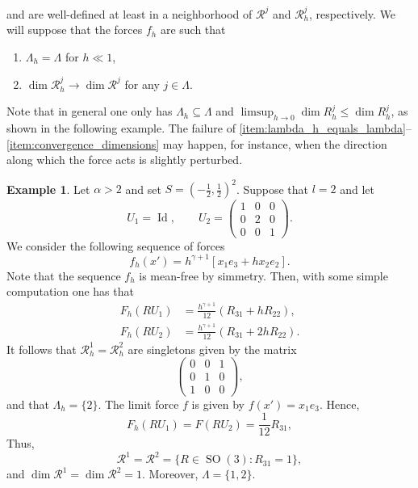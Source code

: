 \documentclass{article}
\theoremstyle{plain}
\theoremstyle{plain}
\theoremstyle{plain}
\theoremstyle{plain}
\theoremstyle{plain}
\theoremstyle{definition}
\theoremstyle{definition}
\newtheorem{example}[teo]{Example}
\DeclareMathOperator{\Id}{Id}
\DeclareMathOperator{\SO}{SO}
\begin{document}
and are well-defined at least in a neighborhood of $\mathcal{R}^j$ and $\mathcal{R}_h^j$, respectively. We will suppose that the forces $f_h$ are such that 
\begin{enumerate}[start=1,label={(F\arabic*)}]
	\item $\Lambda_h = \Lambda$ for $h \ll 1$, \label{item:lambda_h_equals_lambda}
	\item $\dim \mathcal{R}_h^j \to \dim \mathcal{R}^j$ for any $j \in \Lambda$. \label{item:convergence_dimensions}
\end{enumerate}
Note that in general one only has $ \Lambda_{h} \subseteq \Lambda $ and $ \limsup_{h \to 0} \dim R_{h}^{j} \leq \dim R_{h}^{j} $, as shown in the following example.
The failure of \ref{item:lambda_h_equals_lambda}--\ref{item:convergence_dimensions} may happen, for instance, when the direction along which the force acts is slightly perturbed.

\begin{example}
    Let $ \alpha > 2 $ and set $ S = (-\frac{1}{2},\frac{1}{2})^{2} $.
    Suppose that $ l =2 $ and let
    \begin{equation}
        U_{1} = \Id, \qquad U_{2} = \begin{pmatrix}
            1 & 0 & 0\\
            0 & 2 & 0\\
            0 & 0 & 1
        \end{pmatrix}.
    \end{equation}
    We consider the following sequence of forces
    \begin{equation}
        f_{h}(x') = h^{\gamma + 1} [x_{1}e_{3} + hx_{2}e_{2}] .
    \end{equation}
    Note that the sequence $ f_{h} $ is mean-free by simmetry.
    Then, with some simple computation one has that
    \begin{align}
        F_{h}(RU_{1}) & = \frac{h^{\gamma + 1}}{12}(R_{31} + h R_{22}), \\
        F_{h}(RU_{2}) & = \frac{h^{\gamma + 1}}{12}(R_{31} + 2h R_{22}) . 
    \end{align}
    It follows that $ \mathcal{R}_{h}^{1} = \mathcal{R}_{h}^{2}$ are singletons given by the matrix
    \begin{equation}
        \begin{pmatrix}
            0 & 0 & 1\\
            0 & 1 & 0\\
            1 & 0 & 0
        \end{pmatrix},
    \end{equation}
    and that  $ \Lambda_{h} = \{2\} $.
    The limit force $ f $ is given by $ f(x') = x_{1} e_{3} $.
    Hence, 
    \begin{equation}
        F_{h}(RU_{1}) = F(RU_{2}) =  \frac{1}{12}R_{31},
    \end{equation}
    Thus,
    \begin{equation}
        \mathcal{R}^{1} = \mathcal{R}^{2} = \{R \in \SO(3) : R_{31} = 1\},
    \end{equation}
    and $ \dim \mathcal{R}^{1} = \dim \mathcal{R}^{2} = 1 $.
    Moreover, $ \Lambda = \{1, 2\} $.
\end{example}
\end{document}

